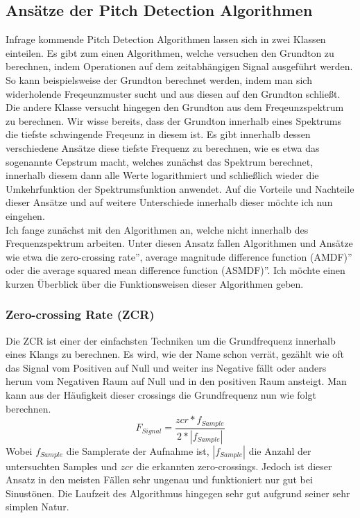 \subsection{Ansätze der Pitch Detection Algorithmen}
Infrage kommende Pitch Detection Algorithmen lassen sich in zwei Klassen einteilen. Es gibt zum einen Algorithmen, welche versuchen den Grundton zu berechnen, indem Operationen auf dem zeitabhängigen Signal ausgeführt werden. So kann beispielsweise der Grundton berechnet werden, indem man sich widerholende Freqeunzmuster sucht und aus diesen auf den Grundton schließt. \cite{cuadra2001hps}
Die andere Klasse versucht hingegen den Grundton aus dem Freqeunzspektrum zu berechnen. Wir wisse bereits, dass der Grundton innerhalb eines Spektrums die tiefste schwingende Freqeunz in diesem ist. Es gibt innerhalb dessen verschiedene Ansätze diese tiefste Frequenz zu berechnen, wie es etwa das sogenannte Cepstrum macht, welches zunächst das Spektrum berechnet, innerhalb diesem dann alle Werte logarithmiert und schließlich wieder die Umkehrfunktion der Spektrumsfunktion anwendet. Auf die Vorteile und Nachteile dieser Ansätze und auf weitere Unterschiede innerhalb dieser möchte ich nun eingehen. \\
Ich fange zunächst mit den Algorithmen an, welche nicht innerhalb des Frequenzspektrum arbeiten. Unter diesen Ansatz fallen Algorithmen und Ansätze wie etwa die \glqq zero-crossing rate'', \glqq average magnitude difference function (AMDF)'' oder die \glqq average squared mean difference function (ASMDF)''. Ich möchte einen kurzen Überblick über die Funktionsweisen dieser Algorithmen geben.

\subsubsection*{Zero-crossing Rate (ZCR)}
Die ZCR ist einer der einfachsten Techniken um die Grundfrequenz innerhalb eines Klangs zu berechnen. Es wird, wie der Name schon verrät, gezählt wie oft das Signal vom Positiven auf Null und weiter ins Negative fällt oder anders herum vom Negativen Raum auf Null und in den positiven Raum ansteigt. Man kann aus der Häufigkeit dieser crossings die Grundfrequenz nun wie folgt berechnen. 
$$ F_{Signal} = \frac{zcr * f_{Sample}}{2 * |f_{Sample}|}$$
Wobei $f_{Sample}$ die Samplerate der Aufnahme ist, $|f_{Sample}|$ die Anzahl der untersuchten Samples und $zcr$ die erkannten zero-crossings. Jedoch ist dieser Ansatz in den meisten Fällen sehr ungenau und funktioniert nur gut bei Sinustönen. Die Laufzeit des Algorithmus hingegen sehr gut aufgrund seiner sehr simplen Natur. \cite{amado2008pitch}

